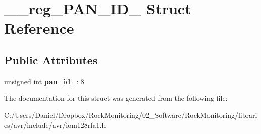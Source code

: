 \hypertarget{struct____reg___p_a_n___i_d__0}{}\section{\+\_\+\+\_\+reg\+\_\+\+P\+A\+N\+\_\+\+I\+D\+\_ Struct Reference}
\label{struct____reg___p_a_n___i_d__0}
\subsection*{Public Attributes}
\begin{DoxyCompactItemize}
\item 
unsigned int {\bfseries pan\+\_\+id\+\_}\+: 8\hypertarget{struct____reg___p_a_n___i_d__0_a3e2950034b095a3f4319797c3878a189}{}\label{struct____reg___p_a_n___i_d__0_a3e2950034b095a3f4319797c3878a189}

\end{DoxyCompactItemize}


The documentation for this struct was generated from the following file\+:\begin{DoxyCompactItemize}
\item 
C\+:/\+Users/\+Daniel/\+Dropbox/\+Rock\+Monitoring/02\+\_\+\+Software/\+Rock\+Monitoring/libraries/avr/include/avr/iom128rfa1.\+h\end{DoxyCompactItemize}
